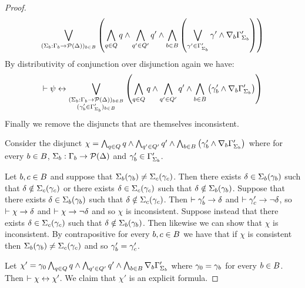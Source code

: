 \begin{proof}
$$\bigvee_{(\Sigma_b : \Gamma_b \to \mathcal{P}(\Delta))_{b \in B}} \left( \bigwedge_{q \in Q} q \land \bigwedge_{q' \in Q'} q' \land \bigwedge_{b \in B} \left(\bigvee_{\gamma' \in \Gamma'_{\Sigma_b}} \gamma' \land \nabla_{b} \Gamma'_{\Sigma_b} \right) \right)
$$
By distributivity of conjunction over disjunction again we have:
$$
\vdash \psi \leftrightarrow
\bigvee_{\substack{(\Sigma_b : \Gamma_b \to \mathcal{P}(\Delta))_{b \in B}\\(\gamma'_b \in \Gamma'_{\Sigma_b})_{b \in B}}}
\left( \bigwedge_{q \in Q} q \land \bigwedge_{q' \in Q'} q' \land \bigwedge_{b \in B} \left(\gamma'_b \land \nabla_{b} \Gamma'_{\Sigma_b} \right) \right)
$$
Finally we remove the disjuncts that are themselves inconsistent.

Consider the disjunct $\chi = \bigwedge_{q \in Q} q \land \bigwedge_{q' \in Q'} q' \land \bigwedge_{b \in B} \left(\gamma'_b \land \nabla_{b} \Gamma'_{\Sigma_b} \right)$ where for every $b \in B$, $\Sigma_b : \Gamma_b \to \mathcal{P}(\Delta)$ and $\gamma'_b \in \Gamma'_{\Sigma_b}$.

Let $b, c \in B$ and suppose that $\Sigma_b(\gamma_b) \neq \Sigma_c(\gamma_c)$.
Then there exists $\delta \in \Sigma_b(\gamma_b)$ such that $\delta \notin \Sigma_c(\gamma_c)$ or
there exists $\delta \in \Sigma_c(\gamma_c)$ such that $\delta \notin \Sigma_b(\gamma_b)$.
Suppose that there exists $\delta \in \Sigma_b(\gamma_b)$ such that $\delta \notin \Sigma_c(\gamma_c)$.
Then $\vdash \gamma'_b \rightarrow \delta$ and $\vdash \gamma'_c \rightarrow \neg \delta$, so $\vdash \chi \rightarrow \delta$ and $\vdash \chi \rightarrow \neg \delta$ and so $\chi$ is inconsistent.
Suppose instead that there exists $\delta \in \Sigma_c(\gamma_c)$ such that $\delta \notin \Sigma_b(\gamma_b)$.
Then likewise we can show that $\chi$ is inconsistent.
By contrapositive for every $b, c \in B$ we have that if $\chi$ is consistent then $\Sigma_b(\gamma_b) \neq \Sigma_c(\gamma_c)$ and so $\gamma'_b = \gamma'_c$.

Let $\chi' = \gamma_0 \bigwedge_{q \in Q} q \land \bigwedge_{q' \in Q'} q' \land \bigwedge_{b \in B} \nabla_{b} \Gamma'_{\Sigma_b}$ where $\gamma_0 = \gamma_b$ for every $b \in B$.
Then $\vdash \chi \leftrightarrow \chi'$.
We claim that $\chi'$ is an explicit formula.


\end{proof}
